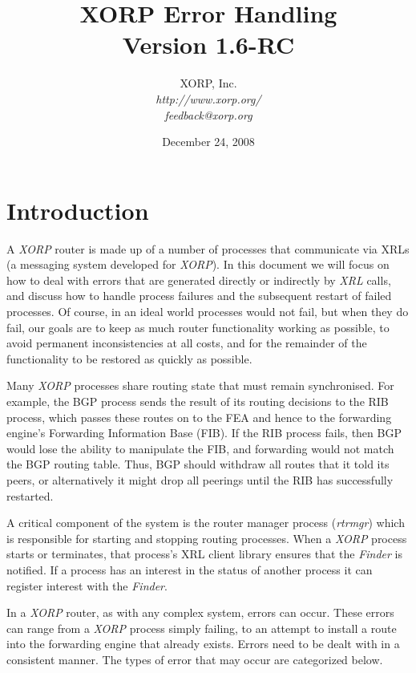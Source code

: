 \documentclass[11pt]{article}
\makeatletter
\newcommand{\xorp} {{\em XORP}\@\xspace}
\newcommand{\finder} {{\em Finder}\@\xspace}
\newcommand{\xrl} {{\em XRL}\@\xspace}
\newcommand{\rtrmgr} {{\em rtrmgr}\@\xspace}
\makeatother
\begin{document}
\title{XORP Error Handling \\
\vspace{1ex}
Version 1.6-RC}
\author{ XORP, Inc.					\\
         {\it http://www.xorp.org/}			\\
	 {\it feedback@xorp.org}
}
\date{December 24, 2008}

\maketitle


\section{Introduction}

A \xorp router is made up of a number of processes that communicate
via XRLs \cite{xorp:xrl} (a messaging system developed for \xorp). In
this document we will focus on how to deal with errors that are
generated directly or indirectly by \xrl calls, and discuss how to
handle process failures and the subsequent restart of failed
processes.  Of course, in an ideal world processes would not fail, but
when they do fail, our goals are to keep as much router
functionality working as possible, to avoid permanent inconsistencies
at all costs, and for the remainder of the functionality to be
restored as quickly as possible.

Many \xorp processes share routing state that must remain
synchronised. For example, the BGP process sends the result of its
routing decisions to the RIB process, which passes these routes on to
the FEA and hence to the forwarding engine's Forwarding Information
Base (FIB). If the RIB process fails, then BGP would lose the ability
to manipulate the FIB, and forwarding would not match the BGP routing
table.  Thus, BGP should withdraw all routes that it told its peers, or
alternatively it might drop all peerings until the RIB has
successfully restarted.

A critical component of the system is the router manager process
(\rtrmgr) which is responsible for starting and stopping routing
processes. When a \xorp process starts or terminates, that
process's XRL client library ensures that the \finder is notified. If
a process has an interest in the status of another process it can
register interest with the \finder.

In a \xorp router, as with any complex system, errors can occur. These
errors can range from a \xorp process simply failing, to an attempt to
install a route into the forwarding engine that already exists. Errors
need to be dealt with in a consistent manner. The types
of error that may occur are categorized below.
\end{document}
